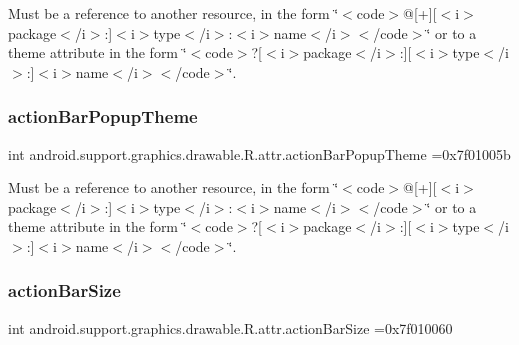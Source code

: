 Must be a reference to another resource, in the form \char`\"{}$<$code$>$@\mbox{[}+\mbox{]}\mbox{[}$<$i$>$package$<$/i$>$\+:\mbox{]}$<$i$>$type$<$/i$>$\+:$<$i$>$name$<$/i$>$$<$/code$>$\char`\"{} or to a theme attribute in the form \char`\"{}$<$code$>$?\mbox{[}$<$i$>$package$<$/i$>$\+:\mbox{]}\mbox{[}$<$i$>$type$<$/i$>$\+:\mbox{]}$<$i$>$name$<$/i$>$$<$/code$>$\char`\"{}. \mbox{\label{classandroid_1_1support_1_1graphics_1_1drawable_1_1R_1_1attr_aea9738f12530be44b271ae9a5b2674ce}} 
\subsubsection{\texorpdfstring{action\+Bar\+Popup\+Theme}{actionBarPopupTheme}}
{\footnotesize\ttfamily int android.\+support.\+graphics.\+drawable.\+R.\+attr.\+action\+Bar\+Popup\+Theme =0x7f01005b\hspace{0.3cm}{\ttfamily [static]}}

Must be a reference to another resource, in the form \char`\"{}$<$code$>$@\mbox{[}+\mbox{]}\mbox{[}$<$i$>$package$<$/i$>$\+:\mbox{]}$<$i$>$type$<$/i$>$\+:$<$i$>$name$<$/i$>$$<$/code$>$\char`\"{} or to a theme attribute in the form \char`\"{}$<$code$>$?\mbox{[}$<$i$>$package$<$/i$>$\+:\mbox{]}\mbox{[}$<$i$>$type$<$/i$>$\+:\mbox{]}$<$i$>$name$<$/i$>$$<$/code$>$\char`\"{}. \mbox{\label{classandroid_1_1support_1_1graphics_1_1drawable_1_1R_1_1attr_a6de126e08e2acf157e6f0456a378e36b}} 
\subsubsection{\texorpdfstring{action\+Bar\+Size}{actionBarSize}}
{\footnotesize\ttfamily int android.\+support.\+graphics.\+drawable.\+R.\+attr.\+action\+Bar\+Size =0x7f010060\hspace{0.3cm}{\ttfamily [static]}}

